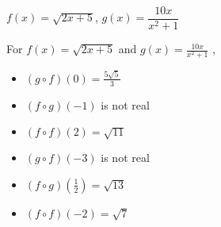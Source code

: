 {$f(x) =\sqrt{2x+5}$, $g(x) = \dfrac{10x}{x^2+1}$}
{ For  $f(x) =\sqrt{2x+5}$ and $g(x) = \frac{10x}{x^2+1}$ ,
\begin{multicols}{2}

\begin{itemize}

\item  $(g\circ f)(0) = \frac{5\sqrt{5}}{3}$

\item  $(f\circ g)(-1)$ is not real

\item  $(f \circ f)(2) = \sqrt{11}$

\item  $(g\circ f)(-3)$ is not real

\item  $(f\circ g)\left(\frac{1}{2}\right) = \sqrt{13}$

\item  $(f \circ f)(-2) = \sqrt{7}$

\end{itemize}

\end{multicols}}